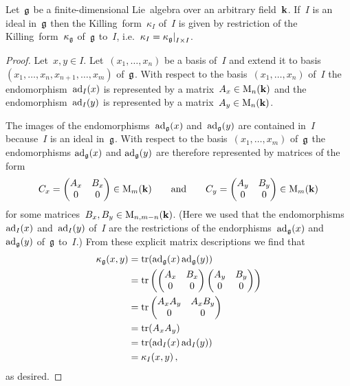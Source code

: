\begin{lemma}
  \label{restriction of the killing form to an ideal}
  Let~$\mathfrak{g}$ be a finite-dimensional Lie~algebra over an arbitrary field~$\mathbf{k}$.
  If~$I$ is an ideal in~$\mathfrak{g}$ then the Killing~form~$\kappa_I$ of~$I$ is given by restriction of the Killing~form~$\kappa_{\mathfrak{g}}$ of~$\mathfrak{g}$ to~$I$, i.e.~$\kappa_I = \restrict{\kappa_{\glie}}{I \times I}$.
\end{lemma}


\begin{proof}
  Let~$x, y \in I$.
  Let~$(x_1, \dotsc, x_n)$ be a basis of~$I$ and extend it to basis~$(x_1, \dotsc, x_n, x_{n+1}, \dotsc, x_m)$ of~$\mathfrak{g}$.
  With respect to the basis~$(x_1, \dotsc, x_n)$ of~$I$ the endomorphism~$\operatorname{ad}_I(x)$ is represented by a matrix~$A_x \in \operatorname{M}_n(\mathbf{k})$ and the endomorphism~$\operatorname{ad}_I(y)$ is represented by a matrix~$A_y \in \operatorname{M}_n(\mathbf{k})$.
  
  The images of the endomorphisms~$\operatorname{ad}_{\mathfrak{g}}(x)$ and~$\operatorname{ad}_{\mathfrak{g}}(y)$ are contained in~$I$ because~$I$ is an ideal in~$\mathfrak{g}$.
  With respect to the basis~$(x_1, \dotsc, x_m)$ of~$\mathfrak{g}$ the endomorphisms $\operatorname{ad}_{\mathfrak{g}}(x)$ and $\operatorname{ad}_{\mathfrak{g}}(y)$ are therefore represented by matrices of the form
  \[
    C_x
    =
    \begin{pmatrix}
      A_x & B_x \\
      0   & 0
    \end{pmatrix}
    \in
    \operatorname{M}_m(\mathbf{k})
    \qquad\text{and}\qquad
    C_y
    =
    \begin{pmatrix}
      A_y & B_y \\
      0   & 0
    \end{pmatrix}
    \in
    \operatorname{M}_m(\mathbf{k})
  \]
  for some matrices~$B_x, B_y \in \operatorname{M}_{n,m-n}(\mathbf{k})$.
  (Here we used that the endomorphisms~$\operatorname{ad}_I(x)$ and~$\operatorname{ad}_I(y)$ of~$I$ are the restrictions of the endorphisms~$\operatorname{ad}_{\mathfrak{g}}(x)$ and~$\operatorname{ad}_{\mathfrak{g}}(y)$ of~$\mathfrak{g}$ to~$I$.)
  From these explicit matrix descriptions we find that
  \begin{align*}
    \kappa_{\mathfrak{g}}(x,y)
    &=
    \operatorname{tr}(\operatorname{ad}_{\mathfrak{g}}(x) \operatorname{ad}_{\mathfrak{g}}(y))
    \\
    &=
    \operatorname{tr}\left(
      \begin{pmatrix}
        A_x & B_x \\
        0   & 0
      \end{pmatrix}
      \begin{pmatrix}
        A_y & B_y \\
        0   & 0
      \end{pmatrix}
    \right)
    \\
    &=
    \operatorname{tr}
    \begin{pmatrix}
      A_x A_y & A_x B_y \\
      0       & 0
    \end{pmatrix}
    \\
    &=
    \operatorname{tr}(A_x A_y)
    \\
    &=
    \operatorname{tr}(\operatorname{ad}_I(x) \operatorname{ad}_I(y))
    \\
    &=
    \kappa_I(x,y) \,,
  \end{align*}
  as desired.
\end{proof}


